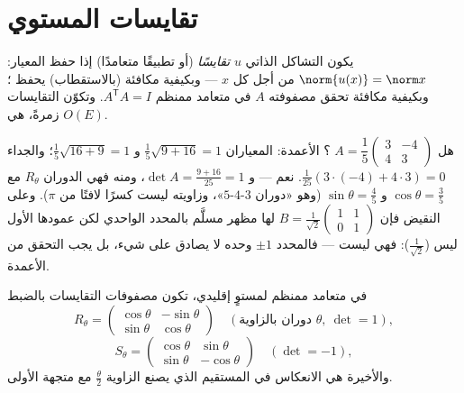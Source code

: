 \section{تقايسات المستوي}

\begin{definition}\label{def:b1:euclid:isometry}
يكون التشاكل الذاتي $u$ 
\emph{تقايسًا} (أو تطبيقًا متعامدًا) إذا حفظ
المعيار: $\norm{u(x)} = \norm x$ من أجل كل $x$ ---
وبكيفية مكافئة (بالاستقطاب) يحفظ ؛
وبكيفية مكافئة تحقق مصفوفته $A$ في  متعامد ممنظم
$A^{\mathsf T} A = I$. وتكوّن التقايسات زمرةً، هي  
$O(E)$.
\end{definition}

\begin{example}
\label{ex:b1:euclid:recognize}
هل $A = \dfrac15\begin{pmatrix} 3 & -4\\ 4 & 3\end{pmatrix}$
؟ الأعمدة: المعياران $\frac15\sqrt{9 + 16} = 1$ و
$\frac15\sqrt{16 + 9} = 1$؛ والجداء $\frac1{25}(3\cdot(-4) +
4\cdot3) = 0$. نعم --- و $\det A = \frac{9 + 16}{25} = 1$، ومنه
فهي الدوران $R_\theta$ مع $\cos\theta = \frac35$ و
$\sin\theta = \frac45$ (وهو «دوران $3$-$4$-$5$»، وزاويته
ليست كسرًا لافتًا من $\pi$). وعلى النقيض فإن $B =
\frac{1}{\sqrt2}\begin{pmatrix} 1 & 1\\ 0 & 1\end{pmatrix}$ لها
مظهر مسلَّم بالمحدد الواحدي لكن عمودها الأول ليس 
($\frac1{\sqrt2}$): فهي ليست  --- فالمحدد $\pm1$ وحده
لا يصادق على شيء، بل يجب التحقق من الأعمدة.
\end{example}

\begin{theorem}\label{thm:b1:euclid:plane}
في  متعامد ممنظم لمستوٍ إقليدي، تكون مصفوفات
التقايسات بالضبط
\[
R_\theta = \begin{pmatrix}
\cos\theta & -\sin\theta\\ \sin\theta & \cos\theta
\end{pmatrix}
\quad (\text{دوران بالزاوية } \theta,\ \det = 1),
\]
\[
S_\theta = \begin{pmatrix}
\cos\theta & \sin\theta\\ \sin\theta & -\cos\theta
\end{pmatrix}
\quad (\det = -1),
\]
والأخيرة هي الانعكاس في المستقيم الذي يصنع الزاوية
$\frac\theta2$ مع متجهة  الأولى.
\end{theorem}

